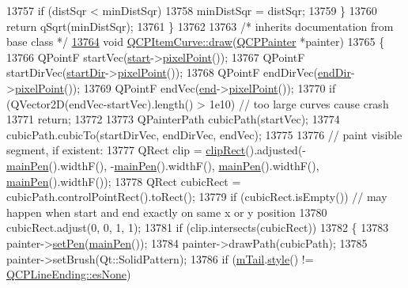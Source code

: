 \begin{DoxyCode}
13757     \textcolor{keywordflow}{if} (distSqr < minDistSqr)
13758       minDistSqr = distSqr;
13759   \}
13760   \textcolor{keywordflow}{return} qSqrt(minDistSqr);
13761 \}
13762 
13763 \textcolor{comment}{/* inherits documentation from base class */}
\hypertarget{a00115_source_l13764}{}\hyperlink{a00034_a56cb5b72cd02db2eda598274a39839a9}{13764} \textcolor{keywordtype}{void} \hyperlink{a00034_a56cb5b72cd02db2eda598274a39839a9}{QCPItemCurve::draw}(\hyperlink{a00047}{QCPPainter} *painter)
13765 \{
13766   QPointF startVec(\hyperlink{a00034_a20c3b5ea31c33764f4f30c2ec7ae518b}{start}->\hyperlink{a00038_ae490f9c76ee2ba33752c495d3b6e8fb5}{pixelPoint}());
13767   QPointF startDirVec(\hyperlink{a00034_aa124bf66c09cc51c627fb49db8bf8a7b}{startDir}->\hyperlink{a00038_ae490f9c76ee2ba33752c495d3b6e8fb5}{pixelPoint}());
13768   QPointF endDirVec(\hyperlink{a00034_a28181a9dee9cc3c3da83a883221bd2d0}{endDir}->\hyperlink{a00038_ae490f9c76ee2ba33752c495d3b6e8fb5}{pixelPoint}());
13769   QPointF endVec(\hyperlink{a00034_a24ecbb195b32a08b42b61c2cf08a1b4d}{end}->\hyperlink{a00038_ae490f9c76ee2ba33752c495d3b6e8fb5}{pixelPoint}());
13770   \textcolor{keywordflow}{if} (QVector2D(endVec-startVec).length() > 1e10) \textcolor{comment}{// too large curves cause crash}
13771     \textcolor{keywordflow}{return};
13772 
13773   QPainterPath cubicPath(startVec);
13774   cubicPath.cubicTo(startDirVec, endDirVec, endVec);
13775 
13776   \textcolor{comment}{// paint visible segment, if existent:}
13777   QRect clip = \hyperlink{a00022_a538e25ff8856534582f5b2b400a46405}{clipRect}().adjusted(-\hyperlink{a00034_a8089126f5645b6edfbaddea49d1e8390}{mainPen}().widthF(), -\hyperlink{a00034_a8089126f5645b6edfbaddea49d1e8390}{mainPen}().widthF(), 
      \hyperlink{a00034_a8089126f5645b6edfbaddea49d1e8390}{mainPen}().widthF(), \hyperlink{a00034_a8089126f5645b6edfbaddea49d1e8390}{mainPen}().widthF());
13778   QRect cubicRect = cubicPath.controlPointRect().toRect();
13779   \textcolor{keywordflow}{if} (cubicRect.isEmpty()) \textcolor{comment}{// may happen when start and end exactly on same x or y position}
13780     cubicRect.adjust(0, 0, 1, 1);
13781   \textcolor{keywordflow}{if} (clip.intersects(cubicRect))
13782   \{
13783     painter->\hyperlink{a00047_af9c7a4cd1791403901f8c5b82a150195}{setPen}(\hyperlink{a00034_a8089126f5645b6edfbaddea49d1e8390}{mainPen}());
13784     painter->drawPath(cubicPath);
13785     painter->setBrush(Qt::SolidPattern);
13786     \textcolor{keywordflow}{if} (\hyperlink{a00034_af1dca285b97e3f5b892dab827a79f327}{mTail}.\hyperlink{a00046_aea324dbfddbca9895ca8a3a968671299}{style}() != \hyperlink{a00046_a5ef16e6876b4b74959c7261d8d4c2cd5aca12d500f50cd6871766801bac30fb03}{QCPLineEnding::esNone})

\end{DoxyCode}
